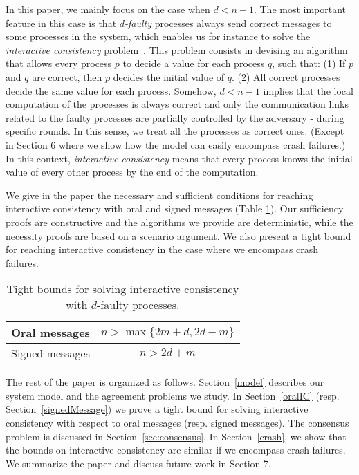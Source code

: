 \documentclass[11pt,letterpaper]{article}
\newcommand{\tmem}[1]{{\em #1\/}}
\begin{document}
In this paper, we mainly focus on the case when $d<n-1$.
The most important feature in this case is that {\tmem{$d$-faulty}}
processes always send correct messages to some processes in the system,
which enables us for instance to solve the \tmem{interactive consistency} problem~\cite{fischer1983consensus}. This problem consists in devising an algorithm
that allows every process $p$ to decide a value for each process $q$,
such that: (1) If $p$ and $q$ are correct, then $p$ decides the
initial value of $q$. (2) All correct processes decide the same
value for each process. Somehow, $d<n-1$ implies that the local
computation of the processes is always correct and only the
communication links related to the faulty processes are partially
controlled by the adversary - during specific rounds.
In this sense,  we treat all the processes as
correct ones. (Except in Section 6 where we show how the model 
can easily encompass crash failures.) 
In this context, {\tmem{interactive consistency}}
means that every process knows the initial value of every other
process by the end of the computation.

We give in the paper the necessary and sufficient
conditions for reaching interactive consistency with oral and signed
messages (Table \ref{tab:results}). Our sufficiency proofs are constructive and the algorithms
we provide are deterministic, while the necessity proofs are based on a 
scenario argument. We also present a tight bound for reaching interactive
consistency in the case where we encompass crash failures.


\begin{table}[h]
\centering
\begin{tabular}{|c|c|}
\hline
Oral messages & $n> \max \{ 2m+d,2d+m \}$\\
\hline
Signed messages & $n>2d+m$\\
\hline
\end{tabular}
\caption{\label{tab:results}Tight bounds  for solving
interactive consistency with $d$-faulty processes.}
\end{table}

The rest of the paper is organized as follows. Section~\ref{model} describes our system model and the agreement problems we study. In Section~\ref{oralIC}  (resp. Section~\ref{signedMessage}) 
we prove a  tight bound for solving interactive consistency  with respect to oral messages (resp. signed messages). 
The consensus problem is discussed in Section~\ref{sec:consensus}. 
In Section~\ref{crash}, we show that the bounds on interactive consistency are similar if we encompass crash failures. 
We summarize the paper and discuss future work in Section 7.













\newpage




\newpage
\appendix


\end{document}
